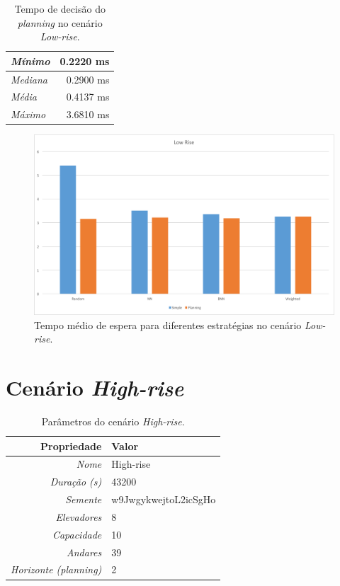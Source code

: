 \begin{table}[htb]
\centering
\caption{Tempo de decisão do \textit{planning} no cenário \textit{Low-rise}.}
\label{table:results:lowrise:time}
\begin{tabular}{|l|r|}
\hline
\textit{Mínimo}  & 0.2220 ms \\ \hline
\textit{Mediana} & 0.2900 ms \\ \hline
\textit{Média}   & 0.4137 ms \\ \hline
\textit{Máximo}  & 3.6810 ms \\ \hline
\end{tabular}
\end{table}

\begin{figure}[htb]
  \centering
  \includegraphics[scale=0.5]{img/chart-averages-low-rise}
  \caption[Tempo médio de espera no cenário \textit{Low-rise}.]{Tempo médio de espera para diferentes estratégias no cenário \textit{Low-rise}.}
  \label{fig:result:average:low-rise}
\end{figure}

\section{Cenário \textit{High-rise}}

\lipsum[1]

\begin{table}[htb!]
\centering
\caption{Parâmetros do cenário \textit{High-rise}.}
\label{tab:results:highrise:params}
\begin{tabular}{|r|l|}
\hline
\textbf{Propriedade}          & \textbf{Valor}       \\ \hline
\textit{Nome}                 & High-rise            \\ \hline
\textit{Duração (s)}          & 43200                \\ \hline
\textit{Semente}              & w9JwgykwejtoL2icSgHo \\ \hline
\textit{Elevadores}           & 8                    \\ \hline
\textit{Capacidade}           & 10                   \\ \hline
\textit{Andares}              & 39                   \\ \hline
\textit{Horizonte (planning)} & 2                    \\ \hline
\end{tabular}
\end{table}

